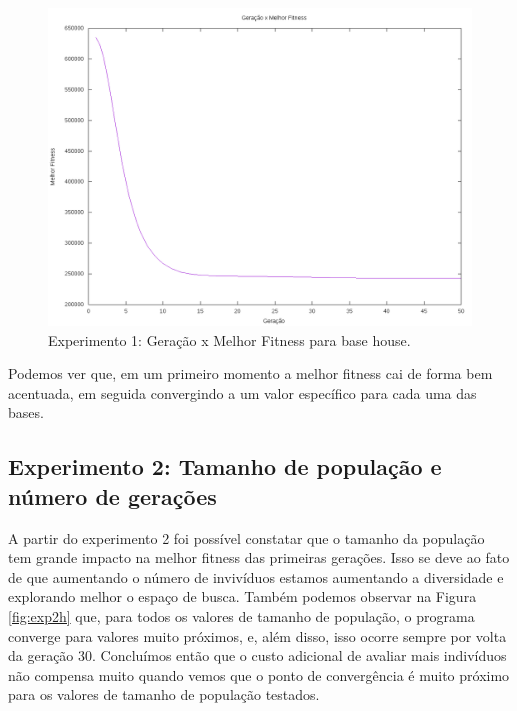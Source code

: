 \documentclass[12pt]{article}
\begin{document}
\begin{figure}[ht]
  \centering
  \includegraphics[width=1\textwidth]{exp1h.png}
  \caption{Experimento 1: Geração x Melhor Fitness para base house.}
  \label{fig:exp1h}
\end{figure}
  
Podemos ver que, em um primeiro momento a melhor fitness cai de forma bem acentuada,
em seguida convergindo a um valor específico para cada uma das bases.

\subsection{Experimento 2: Tamanho de população e número de gerações}

A partir do experimento 2 foi possível constatar que o tamanho da população tem grande impacto
na melhor fitness das primeiras gerações. Isso se deve ao fato de que aumentando o número de
invivíduos estamos aumentando a diversidade e explorando melhor o espaço de busca. Também
podemos observar na Figura \ref{fig:exp2h} que, para todos os valores de tamanho de população,
o programa converge para valores muito próximos, e, além disso, isso ocorre sempre por volta da 
geração 30. Concluímos então que o custo adicional de avaliar mais indivíduos não compensa muito
quando vemos que o ponto de convergência é muito próximo para os valores de tamanho de população
testados.
\end{document}
